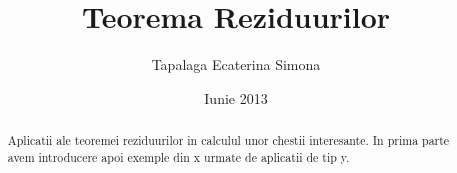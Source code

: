 \documentclass[12pt,a4paper]{article}
\begin{document}
\title{Teorema Reziduurilor}
\author{Tapalaga Ecaterina Simona}
\date{Iunie 2013}
\maketitle

\begin{abstract}
    Aplicatii ale teoremei reziduurilor in calculul unor chestii interesante.
    In prima parte avem introducere apoi exemple din x urmate de aplicatii de tip y.
\end{abstract}

\tableofcontents

\clearpage





\end{document}
